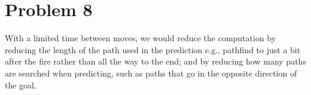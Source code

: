 \documentclass[12pt]{report}
\begin{document}
\section{Problem 8}
With a limited time between moves, we would reduce the computation by reducing the length of the path used in the prediction e.g., pathfind to just a bit after the fire rather than all the way to the end; and by reducing how many paths are searched when predicting, such as paths that go in the opposite direction of the goal.
\end{document}
